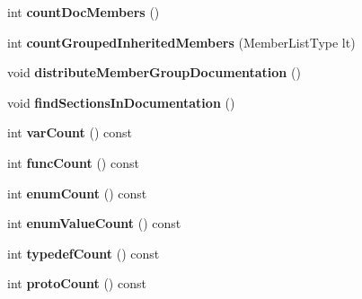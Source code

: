 \begin{DoxyCompactItemize}
\item 
\hypertarget{class_member_group_a68e6a5a77625319c07cbf3f95e142bea}{int {\bfseries count\-Doc\-Members} ()}\label{class_member_group_a68e6a5a77625319c07cbf3f95e142bea}

\item 
\hypertarget{class_member_group_a1c06ff0dbfa086589fe30939ffe00bef}{int {\bfseries count\-Grouped\-Inherited\-Members} (Member\-List\-Type lt)}\label{class_member_group_a1c06ff0dbfa086589fe30939ffe00bef}

\item 
\hypertarget{class_member_group_a2422e453d341daa281687fb6a4e7b76f}{void {\bfseries distribute\-Member\-Group\-Documentation} ()}\label{class_member_group_a2422e453d341daa281687fb6a4e7b76f}

\item 
\hypertarget{class_member_group_ad714b0e193e95efc23bb5de8dfb76cb6}{void {\bfseries find\-Sections\-In\-Documentation} ()}\label{class_member_group_ad714b0e193e95efc23bb5de8dfb76cb6}

\item 
\hypertarget{class_member_group_ac684733d82b26133be4e6fd47443d83f}{int {\bfseries var\-Count} () const }\label{class_member_group_ac684733d82b26133be4e6fd47443d83f}

\item 
\hypertarget{class_member_group_a4993708d453535869dee1b8b99fcc71c}{int {\bfseries func\-Count} () const }\label{class_member_group_a4993708d453535869dee1b8b99fcc71c}

\item 
\hypertarget{class_member_group_ac9567fb822ca9dc34a8f81274a737a43}{int {\bfseries enum\-Count} () const }\label{class_member_group_ac9567fb822ca9dc34a8f81274a737a43}

\item 
\hypertarget{class_member_group_ac262de798638c225648f3c872be6b818}{int {\bfseries enum\-Value\-Count} () const }\label{class_member_group_ac262de798638c225648f3c872be6b818}

\item 
\hypertarget{class_member_group_a5b9c676247b39b4954ad23fa5bbf9e44}{int {\bfseries typedef\-Count} () const }\label{class_member_group_a5b9c676247b39b4954ad23fa5bbf9e44}

\item 
\hypertarget{class_member_group_ad5f4ba0c47bb31003b8db0501b66d585}{int {\bfseries proto\-Count} () const }\label{class_member_group_ad5f4ba0c47bb31003b8db0501b66d585}


\end{DoxyCompactItemize}
